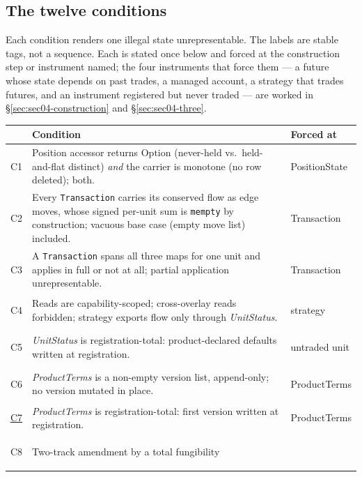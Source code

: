 \subsection{The twelve conditions}
\label{sec:sec04-conditions}

Each condition renders one illegal state unrepresentable. The labels are stable tags, not
a sequence. Each is stated once below and forced at the construction step or instrument
named; the four instruments that force them --- a future whose state depends on past
trades, a managed account, a strategy that trades futures, and an instrument registered but
never traded --- are worked in \S\ref{sec:sec04-construction} and \S\ref{sec:sec04-three}.

\begin{longtable}{@{}p{0.8cm} p{11.0cm} p{2.5cm}@{}}
\toprule
 & \textbf{Condition} & \textbf{Forced at} \\
\midrule
\endhead
\hypertarget{cond:C1}{C1}\label{cond:C1} & Position accessor returns $\mathrm{Option}$
(never-held vs.\ held-and-flat distinct) \emph{and} the carrier is monotone (no row
deleted); both. & PositionState \\
\addlinespace
\hypertarget{cond:C2}{C2}\label{cond:C2} & Every \texttt{Transaction} carries its conserved
flow as edge moves, whose signed per-unit sum is \texttt{mempty} by construction; vacuous
base case (empty move list) included. & Transaction \\
\addlinespace
\hypertarget{cond:C3}{C3}\label{cond:C3} & A \texttt{Transaction} spans all three maps for
one unit and applies in full or not at all; partial application unrepresentable. &
Transaction \\
\addlinespace
\hypertarget{cond:C4}{C4}\label{cond:C4} & Reads are capability-scoped; cross-overlay reads
forbidden; strategy exports flow only through \emph{UnitStatus}. & strategy \\
\addlinespace
\hypertarget{cond:C5}{C5}\label{cond:C5} & \emph{UnitStatus} is registration-total:
product-declared defaults written at registration. & untraded unit \\
\addlinespace
\hypertarget{cond:C6}{C6}\label{cond:C6} & \emph{ProductTerms} is a non-empty version list,
append-only; no version mutated in place. & ProductTerms \\
\addlinespace
\hyperref[cond:C7]{C7} & \emph{ProductTerms} is registration-total: first
version written at registration. & ProductTerms \\
\addlinespace
\hypertarget{cond:C8}{C8}\label{cond:C8} & Two-track amendment by a total fungibility

\end{longtable}
